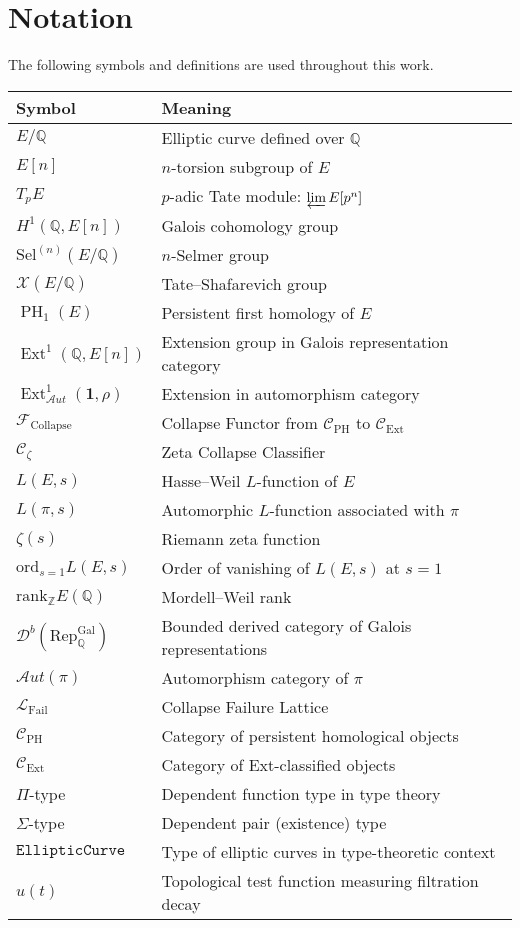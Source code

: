 \documentclass[11pt]{article}
\DeclareMathOperator{\Ext}{Ext}
\DeclareMathOperator{\PH}{PH}
\newcommand{\QQ}{\mathbb{Q}}
\newcommand{\ZZ}{\mathbb{Z}}
\newcommand{\Sha}{\mathcal{X}}
\begin{document}
\section*{Notation}

The following symbols and definitions are used throughout this work.

\begin{center}
\begin{tabular}{p{4cm} p{11cm}}
\hline
\textbf{Symbol} & \textbf{Meaning} \\
\hline
$E/\QQ$ & Elliptic curve defined over $\QQ$ \\
$E[n]$ & $n$-torsion subgroup of $E$ \\
$T_p E$ & $p$-adic Tate module: $\varprojlim E[p^n]$ \\
$H^1(\QQ,E[n])$ & Galois cohomology group \\
$\mathrm{Sel}^{(n)}(E/\QQ)$ & $n$-Selmer group \\
$\Sha(E/\QQ)$ & Tate--Shafarevich group \\
$\PH_1(E)$ & Persistent first homology of $E$ \\
$\Ext^1(\QQ,E[n])$ & Extension group in Galois representation category \\
$\Ext^1_{\mathcal{A}ut}(\mathbf{1}, \rho)$ & Extension in automorphism category \\
$\mathcal{F}_{\mathrm{Collapse}}$ & Collapse Functor from $\mathcal{C}_{\mathrm{PH}}$ to $\mathcal{C}_{\mathrm{Ext}}$ \\
$\mathcal{C}_{\zeta}$ & Zeta Collapse Classifier \\
$L(E,s)$ & Hasse–Weil $L$-function of $E$ \\
$L(\pi,s)$ & Automorphic $L$-function associated with $\pi$ \\
$\zeta(s)$ & Riemann zeta function \\
$\mathrm{ord}_{s=1} L(E,s)$ & Order of vanishing of $L(E,s)$ at $s=1$ \\
$\mathrm{rank}_{\ZZ} E(\QQ)$ & Mordell–Weil rank \\
$\mathcal{D}^b(\mathrm{Rep}_{\QQ}^{\mathrm{Gal}})$ & Bounded derived category of Galois representations \\
$\mathcal{A}ut(\pi)$ & Automorphism category of $\pi$ \\
$\mathcal{L}_{\mathrm{Fail}}$ & Collapse Failure Lattice \\
$\mathcal{C}_{\mathrm{PH}}$ & Category of persistent homological objects \\
$\mathcal{C}_{\mathrm{Ext}}$ & Category of Ext-classified objects \\
$\Pi$-type & Dependent function type in type theory \\
$\Sigma$-type & Dependent pair (existence) type \\
$\texttt{EllipticCurve}$ & Type of elliptic curves in type-theoretic context \\
$u(t)$ & Topological test function measuring filtration decay \\
\hline
\end{tabular}
\end{center}
\end{document}
